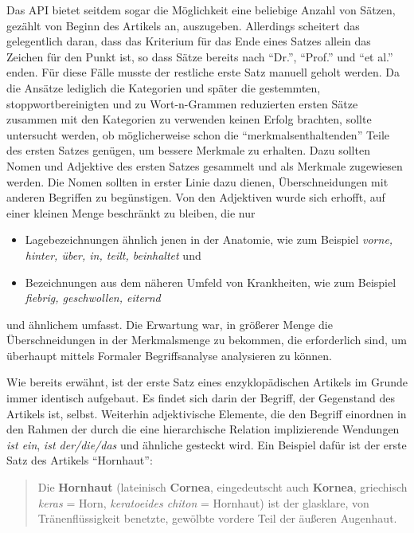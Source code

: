 \documentclass[pagesize,paper=A4,DIV=calc,fontsize=12pt,draft=false]{scrreprt}
\begin{document}
Das API bietet seitdem sogar die Möglichkeit eine beliebige Anzahl von Sätzen, gezählt von Beginn des Artikels an, auszugeben. 
Allerdings scheitert das gelegentlich daran, dass das Kriterium für das Ende eines Satzes allein das Zeichen für den Punkt ist, so dass Sätze bereits nach \enquote{Dr.}, \enquote{Prof.} und \enquote{et al.} enden. 
Für diese Fälle musste der restliche erste Satz manuell geholt werden. 
Da die Ansätze lediglich die Kategorien und später die gestemmten, stoppwortbereinigten und zu Wort-n-Grammen reduzierten ersten Sätze zusammen mit den Kategorien zu verwenden keinen Erfolg brachten, sollte untersucht werden, ob möglicherweise schon die \enquote{merkmalsenthaltenden} Teile des ersten Satzes genügen, um bessere Merkmale zu erhalten. 
Dazu sollten Nomen und Adjektive des ersten Satzes gesammelt und als Merkmale zugewiesen werden. 
Die Nomen sollten in erster Linie dazu dienen, Überschneidungen mit anderen Begriffen zu begünstigen. 
Von den Adjektiven wurde sich erhofft, auf einer kleinen Menge beschränkt zu bleiben, die nur 

\begin{itemize}
\item Lagebezeichnungen ähnlich jenen in der Anatomie, wie zum Beispiel \emph{vorne, hinter, über, in, teilt, beinhaltet} und
\item Bezeichnungen aus dem näheren Umfeld von Krankheiten, wie zum Beispiel \emph{fiebrig, geschwollen, eiternd}
\end{itemize}

und ähnlichem umfasst. 
Die Erwartung war, in größerer Menge die Überschneidungen in der Merkmalsmenge zu bekommen, die erforderlich sind, um überhaupt mittels Formaler Begriffsanalyse analysieren zu können. 

Wie bereits erwähnt, ist der erste Satz eines enzyklopädischen Artikels im Grunde immer identisch aufgebaut. 
Es findet sich darin der Begriff, der Gegenstand des Artikels ist, selbst. 
Weiterhin adjektivische Elemente, die den Begriff einordnen in den Rahmen der durch die eine hierarchische Relation implizierende Wendungen \emph{ist ein}, \emph{ist der/die/das} und ähnliche gesteckt wird. 
Ein Beispiel dafür ist der erste Satz des Artikels \enquote{Hornhaut}: 

\begin{quote}
Die \textbf{Hornhaut} (lateinisch \textbf{Cornea}, eingedeutscht auch \textbf{Kornea}, griechisch \emph{keras} = Horn, \emph{keratoeides chiton} = Hornhaut) ist der glasklare, von Tränenflüssigkeit benetzte, gewölbte vordere Teil der äußeren Augenhaut. 
\end{quote}
\end{document}
